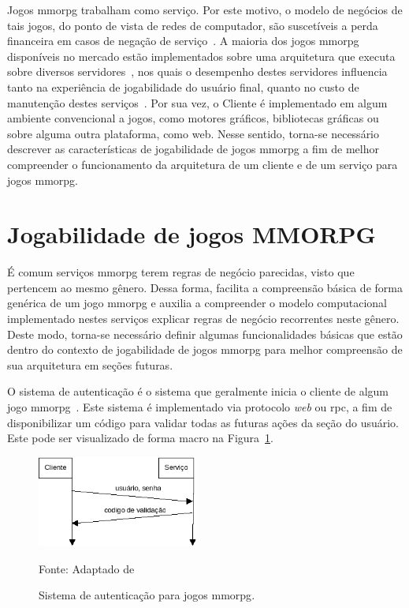 Jogos \ac{mmorpg} trabalham como serviço.
%
Por este motivo, o modelo de negócios de tais jogos, do ponto de vista de redes de computador, são suscetíveis a perda financeira em casos de negação de serviço~\cite{1417630}.
%
A maioria dos jogos \ac{mmorpg} disponíveis no mercado estão implementados sobre uma arquitetura que executa sobre diversos servidores~\cite{stephenclarkewillson2017}, nos quais o desempenho destes servidores influencia tanto na experiência de jogabilidade do usuário final, quanto no custo de manutenção destes serviços~\cite{1417630}.
%
Por sua vez, o Cliente é implementado em algum ambiente convencional a jogos, como motores gráficos, bibliotecas gráficas ou sobre alguma outra plataforma, como web.
%
Nesse sentido, torna-se necessário descrever as características de jogabilidade de jogos \ac{mmorpg} a fim de melhor compreender o funcionamento da arquitetura de um cliente e de um serviço para jogos \ac{mmorpg}.



\section{Jogabilidade de jogos MMORPG}
\label{sec:jogabilidade}



É comum serviços \ac{mmorpg} terem regras de negócio parecidas, visto que pertencem ao mesmo gênero.
%
Dessa forma, facilita a compreensão básica de forma genérica de um jogo \ac{mmorpg} e auxilia a compreender o modelo computacional implementado nestes serviços explicar regras de negócio recorrentes neste gênero.
%
Deste modo, torna-se necessário definir algumas funcionalidades básicas que estão dentro do contexto de jogabilidade de jogos \ac{mmorpg} para melhor compreensão de sua arquitetura em seções futuras.


O sistema de autenticação é o sistema que geralmente inicia o cliente de algum jogo \ac{mmorpg}~\cite{albion_online_unite, matthiasrudy2011}.
%
Este sistema é implementado via protocolo \textit{web} ou \ac{rpc}, a fim de disponibilizar um código para validar todas as futuras ações da seção do usuário.
%
Este pode ser visualizado de forma macro na Figura~\ref{fig:autenticacao}.

\begin{figure}[htb!]
\caption{Sistema de autenticação para jogos \ac{mmorpg}.}
\label{fig:autenticacao}
\includegraphics[height=3cm]{img/cap2/autenticacao.png}
\centering

Fonte: Adaptado de ~\cite{LeckyThompson2008Nov}
\end{figure}


